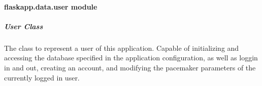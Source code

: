 \documentclass[letterpaper,10pt,english]{sphinxmanual}
\begin{document}
\paragraph{flaskapp.data.user module}
\label{\detokenize{flaskapp.data:module-flaskapp.data.user}}\label{\detokenize{flaskapp.data:flaskapp-data-user-module}}

\subparagraph{User Class}
\label{\detokenize{flaskapp.data:user-class}}
The class to represent a user of this application.
Capable of initializing and accessing the database
specified in the application configuration, as well
as loggin in and out, creating an account, and
modifying the pacemaker parameters of the currently
logged in user.
\end{document}
